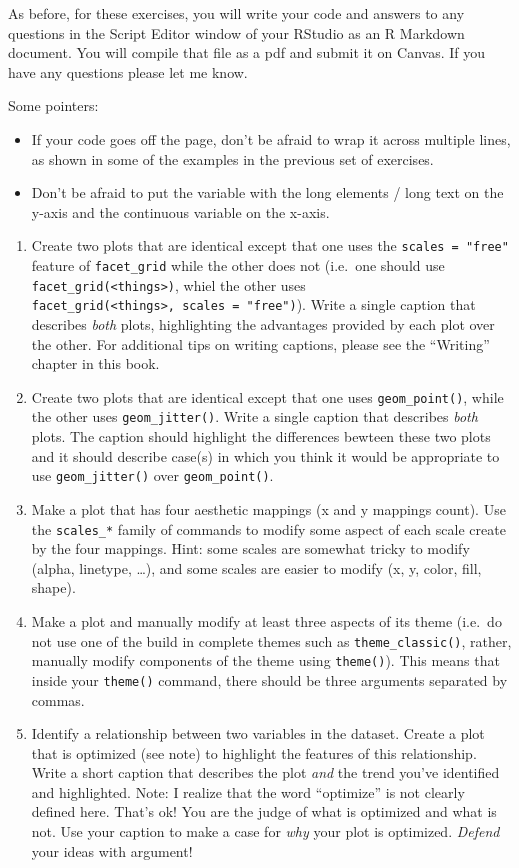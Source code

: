 \documentclass[
]{krantz}
\begin{document}
As before, for these exercises, you will write your code and answers to any questions in the Script Editor window of your RStudio as an R Markdown document. You will compile that file as a pdf and submit it on Canvas. If you have any questions please let me know.

Some pointers:

\begin{itemize}
\item
  If your code goes off the page, don't be afraid to wrap it across multiple lines, as shown in some of the examples in the previous set of exercises.
\item
  Don't be afraid to put the variable with the long elements / long text on the y-axis and the continuous variable on the x-axis.
\end{itemize}

\begin{enumerate}
\def\labelenumi{\arabic{enumi}.}
\item
  Create two plots that are identical except that one uses the \texttt{scales\ =\ "free"} feature of \texttt{facet\_grid} while the other does not (i.e.~one should use \texttt{facet\_grid(\textless{}things\textgreater{})}, whiel the other uses \texttt{facet\_grid(\textless{}things\textgreater{},\ scales\ =\ "free")}). Write a single caption that describes \emph{both} plots, highlighting the advantages provided by each plot over the other. For additional tips on writing captions, please see the ``Writing'' chapter in this book.
\item
  Create two plots that are identical except that one uses \texttt{geom\_point()}, while the other uses \texttt{geom\_jitter()}. Write a single caption that describes \emph{both} plots. The caption should highlight the differences bewteen these two plots and it should describe case(s) in which you think it would be appropriate to use \texttt{geom\_jitter()} over \texttt{geom\_point()}.
\item
  Make a plot that has four aesthetic mappings (x and y mappings count). Use the \texttt{scales\_*} family of commands to modify some aspect of each scale create by the four mappings. Hint: some scales are somewhat tricky to modify (alpha, linetype, \ldots), and some scales are easier to modify (x, y, color, fill, shape).
\item
  Make a plot and manually modify at least three aspects of its theme (i.e.~do not use one of the build in complete themes such as \texttt{theme\_classic()}, rather, manually modify components of the theme using \texttt{theme()}). This means that inside your \texttt{theme()} command, there should be three arguments separated by commas.
\item
  Identify a relationship between two variables in the dataset. Create a plot that is optimized (see note) to highlight the features of this relationship. Write a short caption that describes the plot \emph{and} the trend you've identified and highlighted. Note: I realize that the word ``optimize'' is not clearly defined here. That's ok! You are the judge of what is optimized and what is not. Use your caption to make a case for \emph{why} your plot is optimized. \emph{Defend} your ideas with argument!
\end{enumerate}
\end{document}
